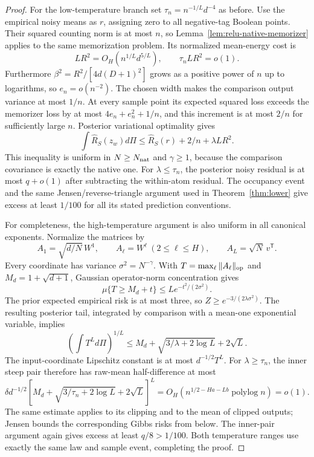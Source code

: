 \begin{proof}
For the low-temperature branch set
$\tau_n=n^{-1/L}d^{-4}$ as before.
Use the empirical noisy means as $r$, assigning zero to all
negative-tag Boolean points.  Their squared counting norm is at most
$n$, so Lemma~\ref{lem:relu-native-memorizer} applies to the same
memorization problem.  Its normalized mean-energy cost is
\[
 LR^2=O_H(n^{1/L}d^{5/L}),\qquad \tau_nLR^2=o(1).
\]
Furthermore
$\beta^2=R^2/[4d(D+1)^2]$ grows as a positive power of $n$ up to
logarithms, so $e_n=o(n^{-2})$.
The chosen width makes the comparison output variance at most $1/n$.
At every sample point its expected squared loss exceeds the
memorizer loss by at most $4e_n+e_n^2+1/n$, and this increment is
at most $2/n$ for sufficiently large $n$.
Posterior variational optimality gives
\[
 \int\widehat R_S(z_w)d\Pi
 \leq\widehat R_S(r)+2/n+\lambda LR^2.
\]
This inequality is uniform in $N\geq N_{\rm nat}$ and $\gamma\geq1$,
because the comparison covariance is exactly the native one.
For $\lambda\leq\tau_n$, the posterior noisy residual is at most
$q+o(1)$ after subtracting the within-atom residual.
The occupancy event and the same Jensen/reverse-triangle argument
used in Theorem~\ref{thm:lower} give excess at least $1/100$ for all
its stated prediction conventions.

For completeness, the high-temperature argument is also uniform in
all canonical exponents.  Normalize the matrices by
\[
 A_1=\sqrt{d/N}\,W^1,\qquad A_\ell=W^\ell\ (2\leq\ell\leq H),
 \qquad A_L=\sqrt N\,v^{\mathsf T}.
\]
Every coordinate has variance $\sigma^2=N^{-\gamma}$.
With $T=\max_\ell\|A_\ell\|_{\rm op}$ and
$M_d=1+\sqrt{d+1}$, Gaussian operator-norm concentration gives
\[
 \mu\{T\geq M_d+t\}\leq L e^{-t^2/(2\sigma^2)}.
\]
The prior expected empirical risk is at most three, so
$Z\geq e^{-3/(2\lambda\sigma^2)}$.
The resulting posterior tail, integrated by comparison with a
mean-one exponential variable, implies
\[
 \left(\int T^L d\Pi\right)^{1/L}
 \leq M_d+\sqrt{3/\lambda+2\log L}+2\sqrt L.
\]
The input-coordinate Lipschitz constant is at most $d^{-1/2}T^L$.
For $\lambda\geq\tau_n$, the inner steep pair therefore has raw-mean
half-difference at most
\[
 \delta d^{-1/2}
 [M_d+\sqrt{3/\tau_n+2\log L}+2\sqrt L]^L
 =O_H(n^{1/2-Ha-Lb}\operatorname{polylog}n)=o(1).
\]
The same estimate applies to its clipping and to the mean of clipped
outputs; Jensen bounds the corresponding Gibbs risks from below.
The inner-pair argument again gives excess at least $q/8>1/100$.
Both temperature ranges use exactly the same law and sample event,
completing the proof.
\end{proof}


